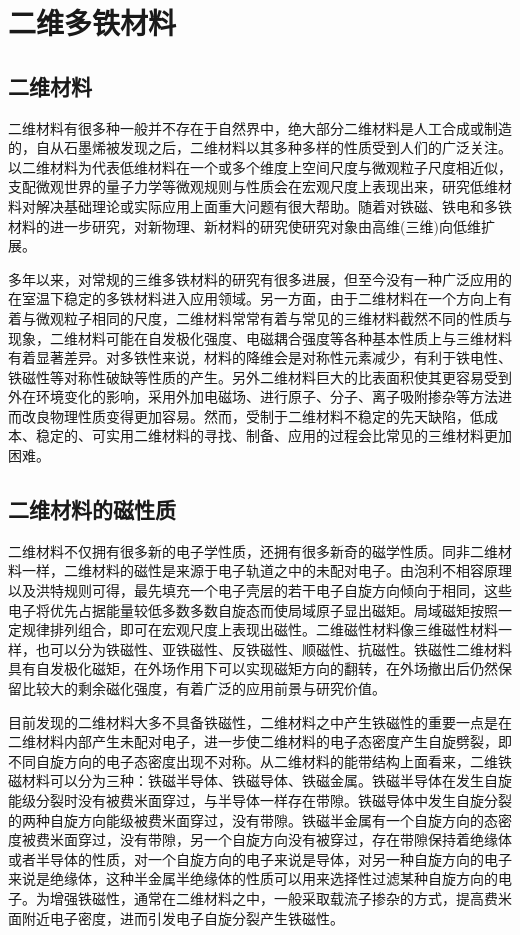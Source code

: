 \chapter{二维多铁材料}

\section{二维材料}

二维材料有很多种一般并不存在于自然界中，绝大部分二维材料是人工合成或制造的，自从石墨烯被发现之后，二维材料以其多种多样的性质受到人们的广泛关注。以二维材料为代表低维材料在一个或多个维度上空间尺度与微观粒子尺度相近似，支配微观世界的量子力学等微观规则与性质会在宏观尺度上表现出来，研究低维材料对解决基础理论或实际应用上面重大问题有很大帮助。\cite{novoselov2004electric}随着对铁磁、铁电和多铁材料的进一步研究，对新物理、新材料的研究使研究对象由高维(三维)向低维扩展。

多年以来，对常规的三维多铁材料的研究有很多进展，但至今没有一种广泛应用的在室温下稳定的多铁材料进入应用领域。另一方面，由于二维材料在一个方向上有着与微观粒子相同的尺度，二维材料常常有着与常见的三维材料截然不同的性质与现象，二维材料可能在自发极化强度、电磁耦合强度等各种基本性质上与三维材料有着显著差异。对多铁性来说，材料的降维会是对称性元素减少，有利于铁电性、铁磁性等对称性破缺等性质的产生。另外二维材料巨大的比表面积使其更容易受到外在环境变化的影响，采用外加电磁场、进行原子、分子、离子吸附掺杂等方法进而改良物理性质变得更加容易。然而，受制于二维材料不稳定的先天缺陷，低成本、稳定的、可实用二维材料的寻找、制备、应用的过程会比常见的三维材料更加困难。

\section{二维材料的磁性质}
二维材料不仅拥有很多新的电子学性质，还拥有很多新奇的磁学性质。同非二维材料一样，二维材料的磁性是来源于电子轨道之中的未配对电子。由泡利不相容原理以及洪特规则可得，最先填充一个电子壳层的若干电子自旋方向倾向于相同，这些电子将优先占据能量较低多数多数自旋态而使局域原子显出磁矩。局域磁矩按照一定规律排列组合，即可在宏观尺度上表现出磁性。二维磁性材料像三维磁性材料一样，也可以分为铁磁性、亚铁磁性、反铁磁性、顺磁性、抗磁性。铁磁性二维材料具有自发极化磁矩，在外场作用下可以实现磁矩方向的翻转，在外场撤出后仍然保留比较大的剩余磁化强度，有着广泛的应用前景与研究价值。

目前发现的二维材料大多不具备铁磁性，二维材料之中产生铁磁性的重要一点是在二维材料内部产生未配对电子，进一步使二维材料的电子态密度产生自旋劈裂，即不同自旋方向的电子态密度出现不对称。从二维材料的能带结构上面看来，二维铁磁材料可以分为三种：铁磁半导体、铁磁导体、铁磁金属。铁磁半导体在发生自旋能级分裂时没有被费米面穿过，与半导体一样存在带隙。铁磁导体中发生自旋分裂的两种自旋方向能级被费米面穿过，没有带隙。铁磁半金属有一个自旋方向的态密度被费米面穿过，没有带隙，另一个自旋方向没有被穿过，存在带隙保持着绝缘体或者半导体的性质，对一个自旋方向的电子来说是导体，对另一种自旋方向的电子来说是绝缘体，这种半金属半绝缘体的性质可以用来选择性过滤某种自旋方向的电子。为增强铁磁性，通常在二维材料之中，一般采取载流子掺杂的方式，提高费米面附近电子密度，进而引发电子自旋分裂产生铁磁性。

